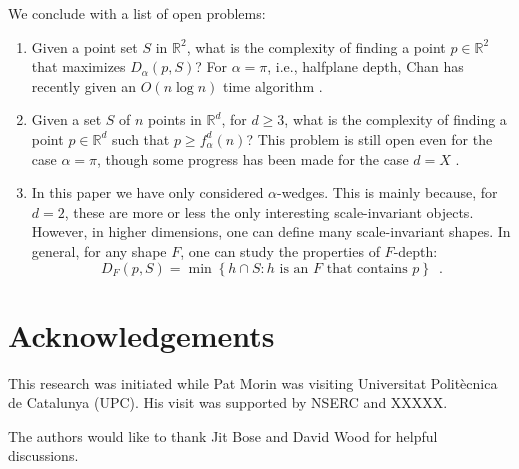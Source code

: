 \documentclass[lotsofwhite]{patmorin}
\begin{document}
We conclude with a list of open problems:

\begin{enumerate}
\item Given a point set $S$ in $\mathbb{R}^2$, what is the complexity
of finding a point $p\in\mathbb{R}^2$ that maximizes $D_\alpha(p,S)$?
For $\alpha=\pi$, i.e., halfplane depth, Chan has recently given an
$O(n\log n)$ time algorithm \cite{c04}.

\item Given a set $S$ of $n$ points in $\mathbb{R}^d$, for $d\ge 3$,
what is the complexity of finding a point $p\in \mathbb{R}^d$ such
that $p\ge f_\alpha^d(n)$?  This problem is still open even for the
case $\alpha=\pi$, though some progress has been made for the case
$d=X$ \cite{X}.

\item In this paper we have only considered $\alpha$-wedges.  This is
mainly because, for $d=2$, these are more or less the only interesting
scale-invariant objects.  However, in higher dimensions, one can
define many scale-invariant shapes.  In general, for any shape $F$,
one can study the properties of $F$-depth:
\[
  D_F(p,S) = \min\left\{ 
     h\cap S : \mbox{$h$ is an $F$ that contains $p$}
  \right\} \enspace .
\] 
\end{enumerate}

\section*{Acknowledgements}

This research was initiated while Pat Morin was visiting Universitat
Polit\`ecnica de Catalunya (UPC).  His visit was supported by NSERC
and XXXXX.  

The authors would like to thank Jit Bose and David Wood for helpful
discussions.



\end{document}
